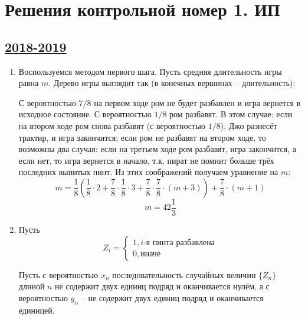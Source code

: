 \thispagestyle{empty}
\section{Решения контрольной номер 1. ИП}

\subsection[2018-2019]{\hyperref[sec:kr_01_ip_2018_2019]{2018-2019}}
\label{sec:sol_kr_01_ip_2018_2019}

\begin{enumerate}
\item Воспользуемся методом первого шага. Пусть средняя длительность игры равна $m$. Дерево игры выглядит так (в конечных вершинах -- длительность):
\begin{center}
\end{center}
С вероятностью $7/8$ на первом ходе ром не будет разбавлен и игра вернется в исходное состояние. С вероятностью $1/8$ ром разбавят. В этом случае: если на втором ходе ром снова разбавят (с вероятностью $1/8$), Джо разнесёт трактир, и игра закончится; если ром не разбавят на втором ходе, то возможны два случая: если на третьем ходе ром разбавят, игра закончится, а если нет, то игра вернется в начало, т.к. пират не помнит больше трёх последних выпитых пинт. Из этих соображений получаем уравнение на $m$:
\[
m=\frac{1}{8}\left(\frac{1}{8}\cdot2+\frac{7}{8}\cdot\frac{1}{8}\cdot3+\frac{7}{8}\cdot\frac{7}{8}\cdot(m+3)\right)+\frac{7}{8}\cdot(m+1)
\]
\[
m=42\frac{1}{3}
\]

\item Пусть 
\[
Z_i=\begin{cases}1, i \mbox{-я пинта разбавлена} \\
0, \mbox{иначе}
\end{cases}
\]

Пусть с вероятностью $x_n$ последовательность случайных величин $\{Z_n\}$ длиной $n$ не содержит двух единиц подряд и оканчивается нулём, а с вероятностью $y_n$ -- не содержит двух единиц подряд и оканчивается единицей. 


\end{enumerate}
